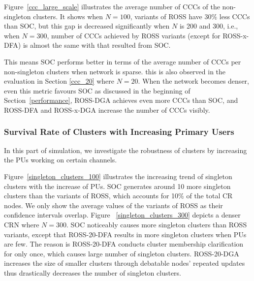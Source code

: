 \documentclass[10pt,journal,compsoc]{IEEEtran}
\theoremstyle{mytheoremstyle}
\theoremstyle{mytheoremstyle}
\theoremstyle{mytheoremstyle}
\newcommand{\ie}{i.e., }
\begin{document}
Figure~\ref{ccc_large_scale} illustrates the average number of CCCs of the non-singleton clusters.
It shows when $N=100$, variants of ROSS have 30\% less CCCs than SOC, but this gap is decreased significantly when $N$ is 200 and 300, \ie when $N=300$, number of CCCs achieved by ROSS variants (except for ROSS-x-DFA) is almost the same with that resulted from SOC.

This means SOC performs better in terms of the average number of CCCs per non-singleton clusters when network is sparse.
this is also observed in the evaluation in Section \ref{ccc_20} where $N=20$.
When the network becomes denser, even this metric favours SOC as discussed in the beginning of Section~\ref{performance}, ROSS-DGA achieves even more CCCs than SOC, and ROSS-DFA and ROSS-x-DGA increase the number of CCCs visibly.




\subsubsection{Survival Rate of Clusters with Increasing Primary Users}

In this part of simulation, we investigate the robustness of clusters by increasing the PUs working on certain channels.
 
Figure~\ref{singleton_clusters_100} illustrates the increasing trend of singleton clusters with the increase of PUs.
SOC generates around 10 more singleton clusters than the variants of ROSS, which accounts for 10\% of the total CR nodes.
We only show the average values of the variants of ROSS as their confidence intervals overlap.
%
Figure ~\ref{singleton_clusters_300} depicts a denser CRN where $N=300$.
SOC noticeably causes more singleton clusters than ROSS variants, except that ROSS-20-DFA results in more singleton clusters when PUs are few.
The reason is ROSS-20-DFA conducts cluster membership clarification for only once, which causes large number of singleton clusters.
ROSS-20-DGA increases the size of smaller clusters through debatable nodes' repeated updates thus drastically decreases the number of singleton clusters.
\end{document}
